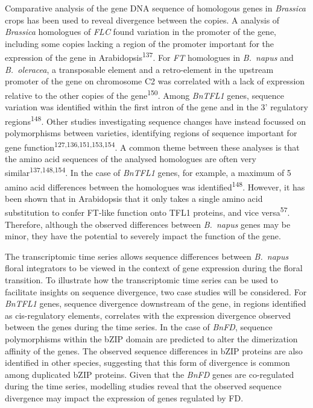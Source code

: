 \documentclass[12pt,]{book}
\begin{document}
Comparative analysis of the gene DNA sequence of homologous genes in
\emph{Brassica} crops has been used to reveal divergence between the
copies. A analysis of \emph{Brassica} homologues of \emph{FLC} found
variation in the promoter of the gene, including some copies lacking a
region of the promoter important for the expression of the gene in
Arabidopsis\textsuperscript{137}. For \emph{FT} homologues in
\emph{B.~napus} and \emph{B.~oleracea}, a transposable element and a
retro-element in the upstream promoter of the gene on chromosome C2 was
correlated with a lack of expression relative to the other copies of the
gene\textsuperscript{150}. Among \emph{BnTFL1} genes, sequence variation
was identified within the first intron of the gene and in the 3'
regulatory regions\textsuperscript{148}. Other studies investigating
sequence changes have instead focussed on polymorphisms between
varieties, identifying regions of sequence important for gene
function\textsuperscript{127,136,151,153,154}. A common theme between
these analyses is that the amino acid sequences of the analysed
homologues are often very similar\textsuperscript{137,148,154}. In the
case of \emph{BnTFL1} genes, for example, a maximum of 5 amino acid
differences between the homologues was identified\textsuperscript{148}.
However, it has been shown that in Arabidopsis that it only takes a
single amino acid substitution to confer FT-like function onto TFL1
proteins, and vice versa\textsuperscript{57}. Therefore, although the
observed differences between \emph{B.~napus} genes may be minor, they
have the potential to severely impact the function of the gene.

The transcriptomic time series allows sequence differences between
\emph{B.~napus} floral integrators to be viewed in the context of gene
expression during the floral transition. To illustrate how the
transcriptomic time series can be used to facilitate insights on
sequence divergence, two case studies will be considered. For
\emph{BnTFL1} genes, sequence divergence downstream of the gene, in
regions identified as cis-regulatory elements, correlates with the
expression divergence observed between the genes during the time series.
In the case of \emph{BnFD}, sequence polymorphisms within the bZIP
domain are predicted to alter the dimerization affinity of the genes.
The observed sequence differences in bZIP proteins are also identified
in other species, suggesting that this form of divergence is common
among duplicated bZIP proteins. Given that the \emph{BnFD} genes are
co-regulated during the time series, modelling studies reveal that the
observed sequence divergence may impact the expression of genes
regulated by FD.
\end{document}
